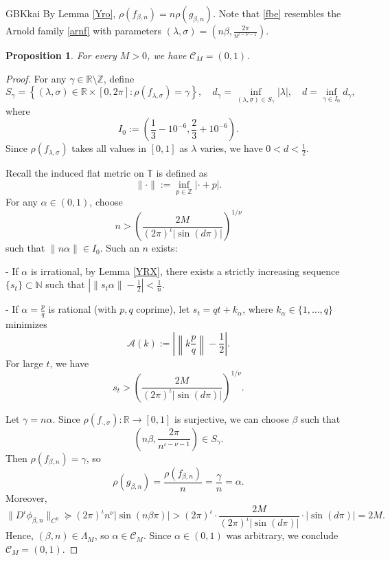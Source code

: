 \documentclass{amsart}
\newtheorem{Proposition}[Definition]{Proposition}
\theoremstyle{definition}
\begin{document}
\begin{CJK*}{GBK}{kai}
By Lemma \ref{Yro}, $\rho(f_{\beta,n}) = n\rho(g_{\beta,n})$. Note that \eqref{fbe} resembles the Arnold family \eqref{arnf} with parameters \( (\lambda, \sigma) = \left(n\beta, \frac{2\pi}{n^{\iota-\nu-1}}\right) \).

\begin{Proposition} \label{DW}
For every \( M > 0 \), we have \( \mathcal{C}_M = (0,1) \).
\end{Proposition}

\begin{proof}
For any \( \gamma \in \mathbb{R} \setminus \mathbb{Z} \), define
\[
S_\gamma = \left\{ (\lambda, \sigma) \in \mathbb{R} \times [0, 2\pi] : \rho(f_{\lambda,\sigma}) = \gamma \right\}, \quad
d_\gamma = \inf_{(\lambda,\sigma) \in S_\gamma} |\lambda|, \quad
d = \inf_{\gamma \in I_0} d_\gamma,
\]
where
\[
I_0 := \left(\frac{1}{3} - 10^{-6}, \frac{2}{3} + 10^{-6}\right).
\]
Since $\rho(f_{\lambda,\sigma})$ takes all values in $[0,1]$ as $\lambda$ varies, we have \( 0 < d < \frac{1}{2} \).

Recall the induced flat metric on \( \mathbb{T} \) is defined as
\[
\|\cdot\| := \inf_{p \in \mathbb{Z}} |\cdot + p|.
\]
For any \( \alpha \in (0,1) \), choose
\[
n > \left( \frac{2M}{(2\pi)^{\iota} |\sin(d\pi)|} \right)^{1/\nu}
\]
such that $\|n\alpha\| \in I_0$. Such an \( n \) exists:

- If \( \alpha \) is irrational, by Lemma \ref{YRX}, there exists a strictly increasing sequence \( \{s_t\} \subset \mathbb{N} \) such that \( \left| \|s_t \alpha\| - \frac{1}{2} \right| < \frac{1}{n} \).

- If \( \alpha = \frac{p}{q} \) is rational (with \( p, q \) coprime), let \( s_t = q t + k_\alpha \), where \( k_\alpha \in \{1, \dots, q\} \) minimizes
\[
\mathcal{A}(k) := \left| \left\|k \frac{p}{q}\right\| - \frac{1}{2} \right|.
\]
For large \( t \), we have
\[
s_t > \left( \frac{2M}{(2\pi)^{\iota} |\sin(d\pi)|} \right)^{1/\nu}.
\]

Let \( \gamma = n\alpha \). Since $\rho(f_{\cdot,\sigma}): \mathbb{R} \to [0,1]$ is surjective, we can choose \( \beta \) such that
\[
\left(n\beta, \frac{2\pi}{n^{\iota-\nu-1}}\right) \in S_\gamma.
\]
Then \( \rho(f_{\beta,n}) = \gamma \), so
\[
\rho(g_{\beta,n}) = \frac{\rho(f_{\beta,n})}{n} = \frac{\gamma}{n} = \alpha.
\]
Moreover,
\[
\|D^{\iota}\phi_{\beta,n}\|_{C^0} \succcurlyeq (2\pi)^{\iota} n^{\nu} |\sin(n\beta\pi)| > (2\pi)^{\iota} \cdot \frac{2M}{(2\pi)^{\iota} |\sin(d\pi)|} \cdot |\sin(d\pi)| = 2M.
\]
Hence, \( (\beta, n) \in \Lambda_M \), so \( \alpha \in \mathcal{C}_M \). Since \( \alpha \in (0,1) \) was arbitrary, we conclude \( \mathcal{C}_M = (0,1) \).
\end{proof}


\end{CJK*}
\end{document}

